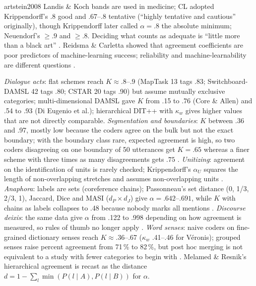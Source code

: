 \begin{papercard}{artstein2008}
 Landis \& Koch bands are used in medicine; CL adopted Krippendorff's $.8$ good and $.67$--$.8$ tentative (``highly tentative and cautious'' originally), though Krippendorff later called $\alpha=.8$ the absolute minimum; Neuendorf's $\ge.9$ and $\ge.8$. Deciding what counts as adequate is ``little more than a black art'' . Reidsma \& Carletta showed that agreement coefficients are poor predictors of machine-learning success; reliability and machine-learnability are different questions .

 \emph{Dialogue acts}: flat schemes reach $K\approx.8$--$.9$ (MapTask 13 tags .83; Switchboard-DAMSL 42 tags .80; CSTAR 20 tags .90) but assume mutually exclusive categories; multi-dimensional DAMSL gave $K$ from .15 to .76 (Core \& Allen) and .54 to .93 (Di Eugenio et al.); hierarchical DIT++ with $\kappa_w$ gives higher values that are not directly comparable. \emph{Segmentation and boundaries}: $K$ between .36 and .97, mostly low because the coders agree on the bulk but not the exact boundary; with the boundary class rare, expected agreement is high, so two coders disagreeing on one boundary of 50 utterances get $K=.65$ whereas a finer scheme with three times as many disagreements gets $.75$ . \emph{Unitizing}: agreement on the identification of units is rarely checked; Krippendorff's $\alpha_U$ squares the length of non-overlapping stretches and assumes non-overlapping units . \emph{Anaphora}: labels are sets (coreference chains); Passonneau's set distance (0, 1/3, 2/3, 1), Jaccard, Dice and MASI ($d_P\times d_J$) give $\alpha=.642$--$.691$, while $K$ with chains as labels collapses to .48 because nobody marks all mentions . \emph{Discourse deixis}: the same data give $\alpha$ from .122 to .998 depending on how agreement is measured, so rules of thumb no longer apply . \emph{Word senses}: naive coders on fine-grained dictionary senses reach $K\approx.36$--.67 ($\kappa_w$ .41--.46 for V\'eronis); grouped senses raise percent agreement from 71\,\% to 82\,\%, but post hoc merging is not equivalent to a study with fewer categories to begin with . Melamed \& Resnik's hierarchical agreement is recast as the distance $d=1-\sum_l\min(P(l\mid A),P(l\mid B))$ for $\alpha$.


\end{papercard}
